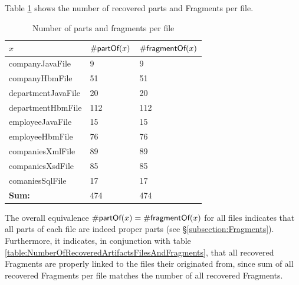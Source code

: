 Table \ref{table:NumberOfPartsAndFragmentsPerFile} shows the number of recovered parts and \glspl{Fragment} per file. 
\begin{table}[h!]
\begin{center}
\begin{tabular}{|l|l|l|}
\hline
$x$ & $\#\textsf{partOf}(x)$ & $\#\textsf{fragmentOf}(x)$
\\ \hline
companyJavaFile & 9 & 9 
\\ \hline
companyHbmFile & 51 & 51 
\\ \hline
departmentJavaFile & 20 & 20 
\\ \hline
departmentHbmFile & 112 & 112 
\\ \hline
employeeJavaFile & 15 & 15 
\\ \hline
employeeHbmFile & 76 & 76 
\\ \hline
companiesXmlFile & 89 & 89 
\\ \hline
companiesXsdFile & 85 & 85 
\\ \hline
comaniesSqlFile & 17 & 17 
\\ \hline \hline
\textbf{Sum:} & 474 & 474 
\\ \hline 
\end{tabular}
\end{center}
\caption{Number of parts and fragments per file}
\label{table:NumberOfPartsAndFragmentsPerFile}
\end{table}
The overall equivalence $\#\textsf{partOf}(x) = \#\textsf{fragmentOf}(x)$ for all files indicates that all parts of each file are indeed proper parts (see §\ref{subsection:Fragments}).
Furthermore, it indicates, in conjunction with table \ref{table:NumberOfRecoveredArtifactsFilesAndFragments}, that all recovered \glspl{Fragment} are properly linked to the files their originated from, since sum of all recovered \glspl{Fragment} per file matches the number of all recovered \glspl{Fragment}.

